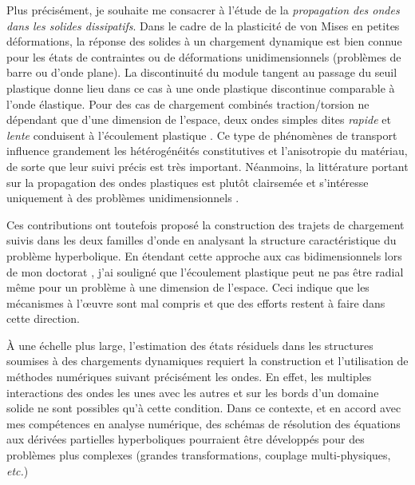 Plus précisément, je souhaite me consacrer à l'étude de la \textit{propagation des ondes dans les solides dissipatifs}.
Dans le cadre de la plasticité de von Mises en petites déformations, la réponse des solides à un chargement dynamique est bien connue pour les états de contraintes ou de déformations unidimensionnels \cite{Taylor,vonKarman} (problèmes de barre ou d'onde plane).
La discontinuité du module tangent au passage du seuil plastique donne lieu dans ce cas à une onde plastique discontinue comparable à l'onde élastique.
Pour des cas de chargement combinés traction/torsion ne dépendant que d'une dimension de l'espace, deux ondes simples dites \textit{rapide} et \textit{lente} conduisent à l'écoulement plastique \cite{Rakhmatulin,CRISTESCU19591605}.
Ce type de phénomènes de transport influence grandement les hétérogénéités constitutives et l'anisotropie du matériau, de sorte que leur suivi précis est très important. %
Néanmoins, la littérature portant sur la propagation des ondes plastiques est plutôt clairsemée et s'intéresse uniquement à des problèmes unidimensionnels \cite{Bleich, Clifton, Ting73}.

Ces contributions ont toutefois proposé la construction des trajets de chargement suivis dans les deux familles d'onde en analysant la structure caractéristique du problème hyperbolique.
En étendant cette approche aux cas bidimensionnels lors de mon doctorat \cite{Thesis}, j'ai souligné que l'écoulement plastique peut ne pas être radial même pour un problème à une dimension de l'espace. %
Ceci indique que les mécanismes à l'\oe uvre sont mal compris et que des efforts restent à faire dans cette direction.

{\`A} une échelle plus large, l'estimation des états résiduels dans les structures soumises à des chargements dynamiques requiert la construction et l'utilisation de méthodes numériques suivant précisément les ondes.
En effet, les multiples interactions des ondes les unes avec les autres et sur les bords d'un domaine solide ne sont possibles qu'à cette condition.
Dans ce contexte, et en accord avec mes compétences en analyse numérique, des schémas de résolution des équations aux dérivées partielles hyperboliques pourraient être développés pour des problèmes plus complexes (grandes transformations, couplage multi-physiques, \textit{etc.})

